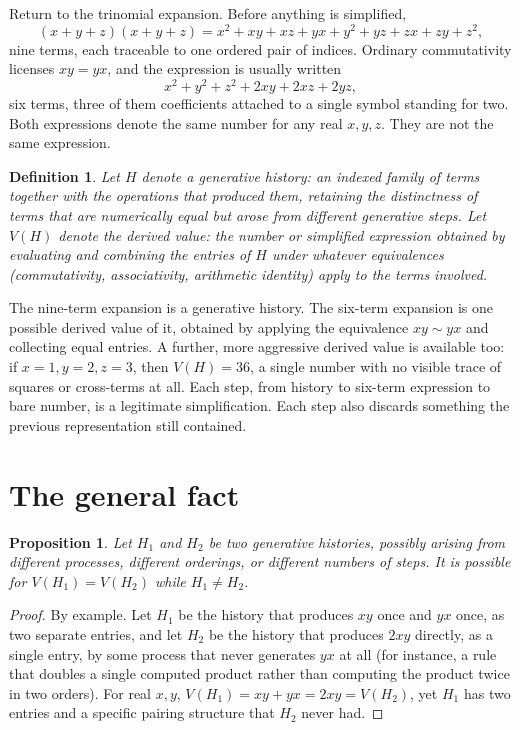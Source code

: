 \documentclass[11pt]{book}
\newtheorem{proposition}[theorem]{Proposition}
\newtheorem{definition}[theorem]{Definition}
\begin{document}
Return to the trinomial expansion. Before anything is simplified,
\[
(x+y+z)(x+y+z) = x^2+xy+xz+yx+y^2+yz+zx+zy+z^2,
\]
nine terms, each traceable to one ordered pair of indices. Ordinary commutativity licenses $xy=yx$, and the expression is usually written
\[
x^2+y^2+z^2+2xy+2xz+2yz,
\]
six terms, three of them coefficients attached to a single symbol standing for two. Both expressions denote the same number for any real $x,y,z$. They are not the same expression.

\begin{definition}
Let $H$ denote a \emph{generative history}: an indexed family of terms together with the operations that produced them, retaining the distinctness of terms that are numerically equal but arose from different generative steps. Let $V(H)$ denote the \emph{derived value}: the number or simplified expression obtained by evaluating and combining the entries of $H$ under whatever equivalences (commutativity, associativity, arithmetic identity) apply to the terms involved.
\end{definition}

The nine-term expansion is a generative history. The six-term expansion is one possible derived value of it, obtained by applying the equivalence $xy \sim yx$ and collecting equal entries. A further, more aggressive derived value is available too: if $x=1,y=2,z=3$, then $V(H)=36$, a single number with no visible trace of squares or cross-terms at all. Each step, from history to six-term expression to bare number, is a legitimate simplification. Each step also discards something the previous representation still contained.

\section{The general fact}

\begin{proposition}
\label{prop:history}
Let $H_1$ and $H_2$ be two generative histories, possibly arising from different processes, different orderings, or different numbers of steps. It is possible for $V(H_1) = V(H_2)$ while $H_1 \ne H_2$.
\end{proposition}
\begin{proof}
By example. Let $H_1$ be the history that produces $xy$ once and $yx$ once, as two separate entries, and let $H_2$ be the history that produces $2xy$ directly, as a single entry, by some process that never generates $yx$ at all (for instance, a rule that doubles a single computed product rather than computing the product twice in two orders). For real $x,y$, $V(H_1)=xy+yx=2xy=V(H_2)$, yet $H_1$ has two entries and a specific pairing structure that $H_2$ never had.
\end{proof}
\end{document}
